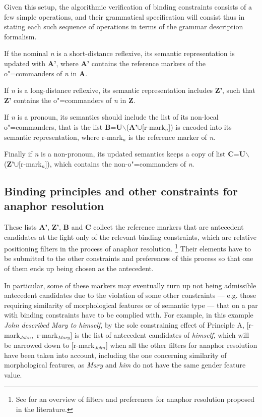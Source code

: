 \documentclass[output=paper
,modfonts
,nonflat]{langsci/langscibook}
\begin{document}
Given this setup, the algorithmic verification of 
binding constraints consists of a few simple operations, and their
grammatical specification will consist thus in stating each such sequence of
operations in terms of the grammar description formalism. 

If the nominal {\it n} is a short-distance
reflexive, its semantic  representation is updated with \textbf{A'}, where \textbf{A'}
contains the reference  markers of the \mbox{o"=commanders} of {\it n} in \textbf{A}. 

If {\it n} is a
long-distance  reflexive, its semantic representation includes \textbf{Z'}, such that \textbf{Z'}
contains the \mbox{o"=commanders} of {\it n} in \textbf{Z}. 

If {\it n} is a pronoun, its semantics 
should include the list of its non-local \linebreak o"=commanders,
that is the list
\textbf{B}=\textbf{U}$\backslash$(\textbf{A'}$\cup$[r-mark$_{n}$])
is encoded into its semantic representation, where r-mark$_{n}$ is the reference marker
of {\it n}.

Finally if {\it n} 
is a non-pronoun, its updated semantics keeps a copy of 
list \linebreak \textbf{C}=\textbf{U}$\backslash$(\textbf{Z'}$\cup$[r-mark$_{n}$]),
which contains the non-o"=commanders of {\it n}.


\subsection{Binding principles and other constraints for anaphor resolution}

These lists \textbf{A'}, \textbf{Z'}, \textbf{B} and \textbf{C} collect
the reference markers that are antecedent candidates
at the light only of the relevant binding constraints, which are
relative positioning filters in the process of anaphor resolution.%
%
\footnote{See \cite[Chap.2]{branco:diss99} for an overview
of filters and preferences for anaphor resolution proposed in the literature.
}
% 
Their elements have to be submitted to the other constraints and preferences
of this process so that one of them ends up 
being chosen as the antecedent.

In particular, some of these markers 
may eventually turn up not being admissible antecedent candidates due to the violation of some
other constraints --- e.g. those requiring similarity of morphological features
or of semantic type --- that on a par with binding constraints
have to be complied with. For example, in this example {\it John described Mary to himself}, by the sole
constraining effect of Principle A, \mbox{[r-mark$_{John}$, r-mark$_{Mary}$]} 
is the list of antecedent candidates of
{\it himself}, which will be narrowed down to [r-mark$_{John}$] when all the other
filters for anaphor resolution have been taken into account, including
the one concerning similarity of morphological features,
as {\it Mary} and {\it him} do not have the same gender feature value.
\end{document}
